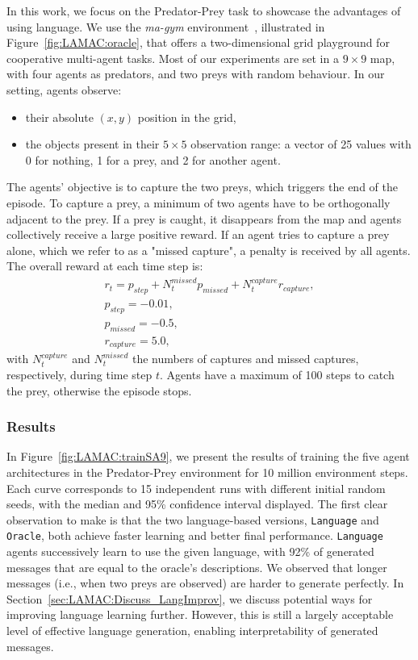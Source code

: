 In this work, we focus on the Predator-Prey task to showcase the advantages of using language. We use the \textit{ma-gym} environment~\citep{Koul2019_magym}, illustrated in Figure~\ref{fig:LAMAC:oracle}, that offers a two-dimensional grid playground for cooperative multi-agent tasks. Most of our experiments are set in a $9\times 9$ map, with four agents as predators, and two preys with random behaviour. In our setting, agents observe:
\begin{itemize}
    \item their absolute $(x, y)$ position in the grid,
    \item the objects present in their $5\times 5$ observation range: a vector of 25 values with 0 for nothing, 1 for a prey, and 2 for another agent.
\end{itemize}
The agents' objective is to capture the two preys, which triggers the end of the episode. To capture a prey, a minimum of two agents have to be orthogonally adjacent to the prey. If a prey is caught, it disappears from the map and agents collectively receive a large positive reward. If an agent tries to capture a prey alone, which we refer to as a "missed capture", a penalty is received by all agents. The overall reward at each time step is:
\begin{gather}
    r_t=p_{step}+N_t^{missed}p_{missed}+N_t^{capture}r_{capture},\\
    p_{step}=-0.01,\\
    p_{missed}=-0.5,\\
    r_{capture}=5.0,
\end{gather}
with $N_t^{capture}$ and $N_t^{missed}$ the numbers of captures and missed captures, respectively, during time step $t$. Agents have a maximum of 100 steps to catch the prey, otherwise the episode stops. 

\subsubsection{Results}

In Figure~\ref{fig:LAMAC:trainSA9}, we present the results of training the five agent architectures in the Predator-Prey environment for 10 million environment steps. Each curve corresponds to 15 independent runs with different initial random seeds, with the median and 95\% confidence interval displayed. The first clear observation to make is that the two language-based versions, \texttt{Language} and \texttt{Oracle}, both achieve faster learning and better final performance. \texttt{Language} agents successively learn to use the given language, with 92\% of generated messages that are equal to the oracle's descriptions. We observed that longer messages (i.e., when two preys are observed) are harder to generate perfectly. 
In Section~\ref{sec:LAMAC:Discuss_LangImprov}, we discuss potential ways for improving language learning further. 
However, this is still a largely acceptable level of effective language generation, enabling interpretability of generated messages.

